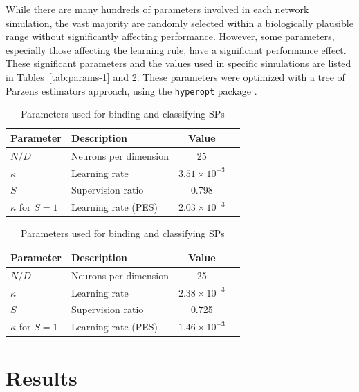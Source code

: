 \documentclass[10pt,letterpaper]{article}
\begin{document}
While there are many hundreds of parameters
involved in each network simulation,
the vast majority are randomly selected
within a biologically plausible range
without significantly affecting performance.
However, some parameters, especially those affecting
the learning rule, have a significant performance effect.
These significant parameters and the values
used in specific simulations are listed
in Tables~\ref{tab:params-1} and \ref{tab:params-2}.
These parameters were optimized
with a tree of Parzens estimators approach,
using the \texttt{hyperopt} package \cite{Bergstra2013}.

\begin{table}[!ht]
\begin{center} 
\caption{Parameters used for transmitting semantic pointers}
\vspace{0.2ex}
\label{tab:params-1} 
\begin{tabular}{llcc} 
\hline
Parameter & Description & Value \\
\hline
$N / D$ & Neurons per dimension & 25 \\
$\kappa$ & Learning rate & $3.51 \times 10^{-3}$ \\
$S$ & Supervision ratio & 0.798 \\
$\kappa$ for $S = 1$ & Learning rate (PES) & $2.03 \times 10^{-3}$\\ 
\hline
\end{tabular} 
\end{center}
\begin{center} 
\caption{Parameters used for binding and classifying SPs}
\vspace{0.2ex}
\label{tab:params-2} 
\begin{tabular}{llcc} 
\hline
Parameter & Description & Value \\
\hline
$N / D$ & Neurons per dimension & 25 \\
$\kappa$ & Learning rate & $2.38 \times 10^{-3}$ \\
$S$ & Supervision ratio & 0.725 \\
$\kappa$ for $S = 1$ & Learning rate (PES) & $1.46 \times 10^{-3}$ \\ 
\hline
\end{tabular} 
\end{center}
\end{table}

\section{Results}
\end{document}

